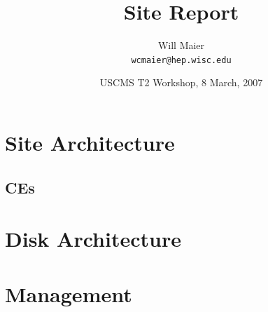 \documentclass{beamer}
\title{Site Report}
\author[Will Maier]{Will Maier \\ \texttt{wcmaier@hep.wisc.edu}}
\institute[Wisconsin]{University of Wisconsin - High Energy Physics}
\date[8 March, 2007]{USCMS T2 Workshop, 8 March, 2007}
\begin{document}

\begin{frame}
    \titlepage
\end{frame}

\section{Site Architecture}
\subsection{CEs}

\section{Disk Architecture}
% 

\section{Management}
\end{document}
